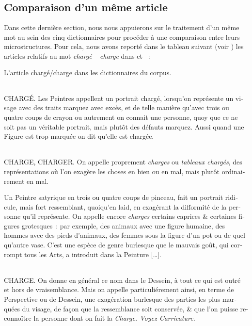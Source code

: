 \documentclass[output=paper,colorlinks,citecolor=brown,arabicfont,chinesefont,booklanguage=french]{langscibook}
\begin{document}
\begin{otherlanguage}{french}
\subsection{Comparaison d’un même article}

Dans cette dernière section, nous nous appuierons sur le traitement d’un même mot au sein des cinq dictionnaires pour procéder à une comparaison entre leurs microstructures. Pour cela, nous avons reporté dans le tableau suivant (voir ) les articles relatifs au mot \emph{chargé} – \emph{charge} dans \citet{Lacombe1752} et \citet{Boutard1826}~:

\begin{exe}
\ex L’article chargé/charge dans les dictionnaires du corpus.
\label{cetro:frequencies}
\begin{xlist}
\ex \citet{Felibien1676}\\
CHARGÉ. Les Peintres appellent un portrait chargé, lorsqu’on représente un visage avec des traits marquez avec excès, et de telle manière qu’avec trois ou quatre coups de crayon ou autrement on connait une personne, quoy que ce ne soit pas un véritable portrait, mais plutôt des défauts marquez. Aussi quand une Figure est trop marquée on dit qu’elle est chargée.

\ex \citet{Marsy1746}\\
CHARGE, CHARGER. On appelle proprement \emph{charges} ou \emph{tableaux chargés}, des représentations où l’on exagère les choses en bien ou en mal, mais plutôt ordinairement en mal.

Un Peintre satyrique en trois ou quatre coups de pinceau, fait un portrait ridicule, mais fort ressemblant, quoiqu’en laid, en exagérant la difformité de la personne qu’il représente. 
On appelle encore \emph{charges} certains caprices \& certaines figures grotesques~: par exemple, des animaux avec une figure humaine, des hommes avec des pieds d’animaux, des femmes sous la figure d’un pot ou de quelqu’autre vase. C’est une espèce de genre burlesque que le mauvais goût, qui corrompt tous les Arts, a introduit dans la Peinture […].
 
\ex \citet{Lacombe1752}\\
CHARGE. On donne en général ce nom dans le Dessein, à tout ce qui est outré et hors de vraisemblance. Mais on appelle particuliérement ainsi, en terme de Perspective ou de Dessein, une exagération burlesque des parties les plus marquées du visage, de façon que la ressemblance soit conservée, \& que l’on puisse reconnoître la personne dont on fait la \emph{Charge. Voyez Carricature.} 


\end{xlist}
\end{exe}
\end{otherlanguage}
\end{document}
